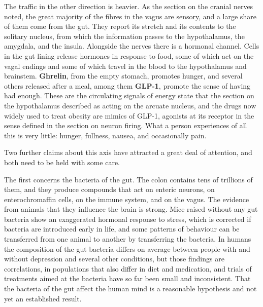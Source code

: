 \documentclass[11pt]{article}
\begin{document}
The traffic in the other direction is heavier. As the section on the cranial nerves noted, the great majority of the fibres in the vagus are sensory, and a large share of them come from the gut. They report its stretch and its contents to the solitary nucleus, from which the information passes to the hypothalamus, the amygdala, and the insula. Alongside the nerves there is a hormonal channel. Cells in the gut lining release hormones in response to food, some of which act on the vagal endings and some of which travel in the blood to the hypothalamus and brainstem. \textbf{Ghrelin}, from the empty stomach, promotes hunger, and several others released after a meal, among them \textbf{GLP-1}, promote the sense of having had enough. These are the circulating signals of energy state that the section on the hypothalamus described as acting on the arcuate nucleus, and the drugs now widely used to treat obesity are mimics of GLP-1, agonists at its receptor in the sense defined in the section on neuron firing. What a person experiences of all this is very little: hunger, fullness, nausea, and occasionally pain.

Two further claims about this axis have attracted a great deal of attention, and both need to be held with some care.

The first concerns the bacteria of the gut. The colon contains tens of trillions of them, and they produce compounds that act on enteric neurons, on enterochromaffin cells, on the immune system, and on the vagus. The evidence from animals that they influence the brain is strong. Mice raised without any gut bacteria show an exaggerated hormonal response to stress, which is corrected if bacteria are introduced early in life, and some patterns of behaviour can be transferred from one animal to another by transferring the bacteria. In humans the composition of the gut bacteria differs on average between people with and without depression and several other conditions, but those findings are correlations, in populations that also differ in diet and medication, and trials of treatments aimed at the bacteria have so far been small and inconsistent. That the bacteria of the gut affect the human mind is a reasonable hypothesis and not yet an established result.
\end{document}
